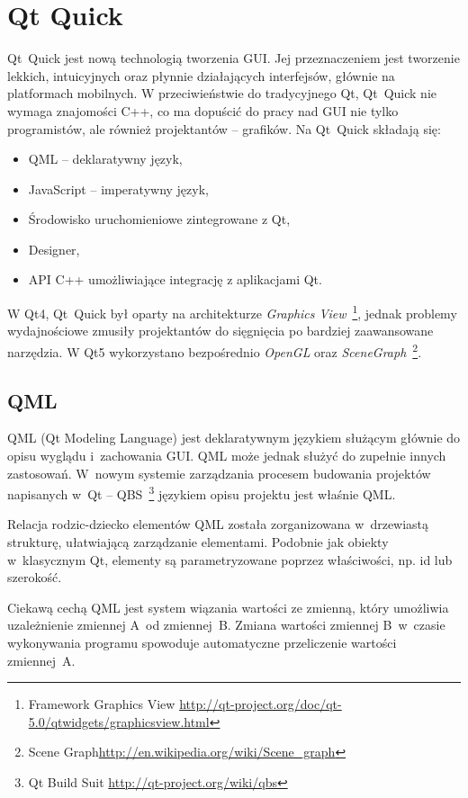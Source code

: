 \section{Qt Quick}
Qt~Quick jest nową technologią tworzenia GUI. Jej przeznaczeniem jest tworzenie lekkich, intuicyjnych oraz płynnie działających interfejsów, głównie na platformach mobilnych. W przeciwieństwie do tradycyjnego Qt, Qt~Quick nie wymaga znajomości C++, co ma dopuścić do pracy nad GUI nie tylko programistów, ale również projektantów -- grafików.
Na Qt~Quick składają się:
\begin{itemize}
\item QML -- deklaratywny język,
\item JavaScript -- imperatywny język,
\item Środowisko uruchomieniowe zintegrowane z Qt,
\item Designer,
\item API C++ umożliwiające integrację z aplikacjami Qt.
\end{itemize}

W Qt4, Qt~Quick był oparty na architekturze \textit{Graphics View}~\footnote{Framework Graphics View  \url{http://qt-project.org/doc/qt-5.0/qtwidgets/graphicsview.html}}, jednak problemy wydajnościowe zmusiły projektantów do sięgnięcia po bardziej zaawansowane narzędzia. W Qt5 wykorzystano bezpośrednio \textit{OpenGL} oraz \textit{SceneGraph}~\footnote{Scene Graph\url{http://en.wikipedia.org/wiki/Scene\_graph}}.

\subsection{QML}
QML (Qt Modeling Language) jest deklaratywnym językiem służącym głównie do opisu wyglądu i~zachowania GUI. QML może jednak służyć do zupełnie innych zastosowań. W~nowym systemie zarządzania procesem budowania projektów napisanych w~Qt -- QBS~\footnote{Qt Build Suit \url{http://qt-project.org/wiki/qbs}} językiem opisu projektu jest właśnie QML.

Relacja rodzic-dziecko elementów QML została zorganizowana w~drzewiastą strukturę, ułatwiającą zarządzanie elementami. Podobnie jak obiekty w~klasycznym Qt, elementy są parametryzowane poprzez  właściwości, np. id lub szerokość. 

Ciekawą cechą QML jest system wiązania wartości ze zmienną, który umożliwia uzależnienie zmiennej A~od zmiennej~B. Zmiana wartości zmiennej B~w~czasie wykonywania programu spowoduje automatyczne przeliczenie wartości zmiennej~A.


